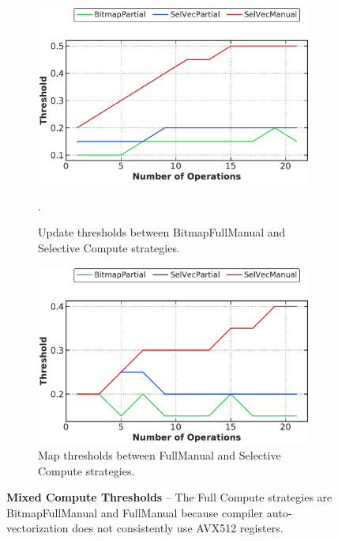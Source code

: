 \documentclass[12pt]{cmuthesis}
\begin{document}
\begin{figure}[t!]
\captionsetup[subfigure]{justification=justified}
\centering
\begin{subfigure}[t]{.49\linewidth}
 \centering
 \includegraphics[width=0.9\linewidth]{eval/snbs_thres_update.pdf}
 \caption{Update thresholds between BitmapFullManual and Selective Compute strategies.}.
  \label{fig:snbs_thres_update}
\end{subfigure}
\begin{subfigure}[t]{.49\linewidth}
 \centering
 \includegraphics[width=0.9\linewidth]{eval/snbs_thres_map.pdf}
 \caption{Map thresholds between FullManual and Selective Compute strategies.}
  \label{fig:snbs_thres_map}
\end{subfigure}
\caption{\textbf{Mixed Compute Thresholds} -- The Full Compute strategies are BitmapFullManual and FullManual because compiler auto-vectorization does not consistently use AVX512 registers.}
\label{fig:snbs_thres}
\end{figure}
\end{document}
